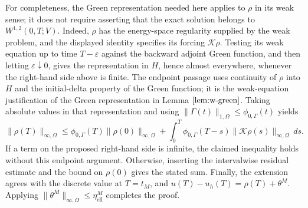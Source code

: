 \documentclass{article}
\begin{document}
For completeness, the Green representation needed here applies to \(\rho\) in its weak sense; it does not require asserting that the exact solution belongs to \(W^{1,2}(0,T;V)\). Indeed, \(\rho\) has the energy-space regularity supplied by the weak problem, and the displayed identity specifies its forcing \(\mathcal K\rho\). Testing its weak equation up to time \(T-\varepsilon\) against the backward adjoint Green function, and then letting \(\varepsilon\downarrow0\), gives the representation in \(H\), hence almost everywhere, whenever the right-hand side above is finite. The endpoint passage uses continuity of \(\rho\) into \(H\) and the initial-delta property of the Green function; it is the weak-equation justification of the Green representation in Lemma \(\ref{lem:w-green}\). Taking absolute values in that representation and using \(\|\Gamma(t)\|_{1,\Omega}\leq\phi_{0,\Gamma}(t)\) yields
\[
\|\rho(T)\|_{\infty,\Omega}
\leq \phi_{0,\Gamma}(T)\|\rho(0)\|_{\infty,\Omega}
 +\int_0^T\phi_{0,\Gamma}(T-s)
                 \|\mathcal K\rho(s)\|_{\infty,\Omega}\,ds.
\]
If a term on the proposed right-hand side is infinite, the claimed inequality holds without this endpoint argument. Otherwise, inserting the intervalwise residual estimate and the bound on \(\rho(0)\) gives the stated sum. Finally, the extension agrees with the discrete value at \(T=t_M\), and \(u(T)-u_h(T)=\rho(T)+\theta^M\). Applying \(\|\theta^M\|_{\infty,\Omega}\leq\eta_{\mathrm{ell}}^M\) completes the proof.
\end{document}
